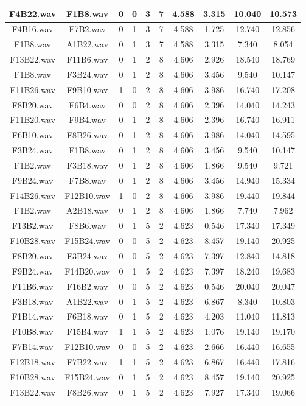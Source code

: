 \documentclass[11pt,a4paper]{book}
\begin{document}
\begin{longtable}[c]{|c|c|c|c|c|c|c|c|c|c|}
F4B22.wav&F1B8.wav&0&0&3&7&4.588&3.315&10.040&10.573\\ \hline
F4B16.wav&F7B2.wav&0&1&3&7&4.588&1.725&12.740&12.856\\ \hline
F1B8.wav&A1B22.wav&0&1&3&7&4.588&3.315&7.340&8.054\\ \hline
F13B22.wav&F11B6.wav&0&1&2&8&4.606&2.926&18.540&18.769\\ \hline
F1B8.wav&F3B24.wav&0&1&2&8&4.606&3.456&9.540&10.147\\ \hline
F11B26.wav&F9B10.wav&1&0&2&8&4.606&3.986&16.740&17.208\\ \hline
F8B20.wav&F6B4.wav&0&0&2&8&4.606&2.396&14.040&14.243\\ \hline
F11B20.wav&F9B4.wav&0&1&2&8&4.606&2.396&16.740&16.911\\ \hline
F6B10.wav&F8B26.wav&0&1&2&8&4.606&3.986&14.040&14.595\\ \hline
F3B24.wav&F1B8.wav&0&1&2&8&4.606&3.456&9.540&10.147\\ \hline
F1B2.wav&F3B18.wav&0&1&2&8&4.606&1.866&9.540&9.721\\ \hline
F9B24.wav&F7B8.wav&0&1&2&8&4.606&3.456&14.940&15.334\\ \hline
F14B26.wav&F12B10.wav&1&0&2&8&4.606&3.986&19.440&19.844\\ \hline
F1B2.wav&A2B18.wav&0&1&2&8&4.606&1.866&7.740&7.962\\ \hline
F13B2.wav&F8B6.wav&0&1&5&2&4.623&0.546&17.340&17.349\\ \hline
F10B28.wav&F15B24.wav&0&0&5&2&4.623&8.457&19.140&20.925\\ \hline
F8B20.wav&F3B24.wav&0&0&5&2&4.623&7.397&12.840&14.818\\ \hline
F9B24.wav&F14B20.wav&0&1&5&2&4.623&7.397&18.240&19.683\\ \hline
F11B6.wav&F16B2.wav&0&0&5&2&4.623&0.546&20.040&20.047\\ \hline
F3B18.wav&A1B22.wav&0&1&5&2&4.623&6.867&8.340&10.803\\ \hline
F1B14.wav&F6B18.wav&0&1&5&2&4.623&4.203&11.040&11.813\\ \hline
F10B8.wav&F15B4.wav&1&1&5&2&4.623&1.076&19.140&19.170\\ \hline
F7B14.wav&F12B10.wav&0&0&5&2&4.623&2.666&16.440&16.655\\ \hline
F12B18.wav&F7B22.wav&1&1&5&2&4.623&6.867&16.440&17.816\\ \hline
F10B28.wav&F15B24.wav&0&1&5&2&4.623&8.457&19.140&20.925\\ \hline
F13B22.wav&F8B26.wav&0&1&5&2&4.623&7.927&17.340&19.066\\ \hline

\end{longtable}
\end{document}
